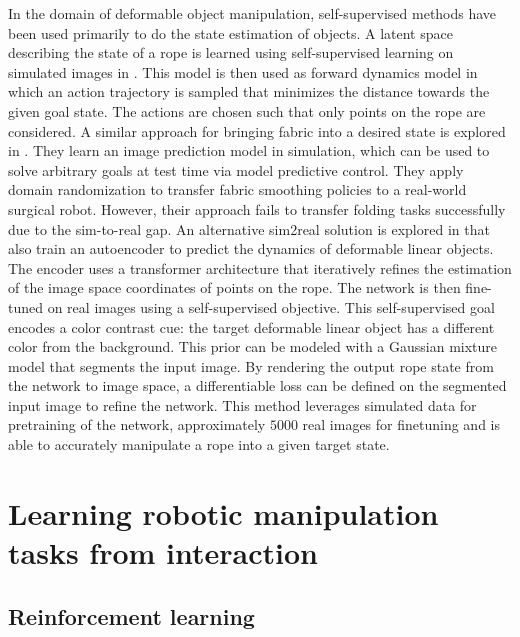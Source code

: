 \documentclass[\home/main.tex]{subfiles}
\begin{document}
In the domain of deformable object manipulation, self-supervised methods have been used primarily to do the state estimation of objects. A latent space describing the state of a rope is learned using self-supervised learning on simulated images in \autocite{yan2020learning}. This model is then used as forward dynamics model in which an action trajectory is sampled that minimizes the distance towards the given goal state. The actions are chosen such that only points on the rope are considered. A similar approach for bringing fabric into a desired state is explored in \autocite{fabric_vsf_2020}. They learn an image prediction model in simulation, which can be used to solve arbitrary goals at test time via model predictive control. They apply domain randomization to transfer fabric smoothing policies to a real-world surgical robot. However, their approach fails to transfer folding tasks successfully due to the sim-to-real gap. An alternative sim2real solution is explored in \autocite{Mengyuan2020} that also train an autoencoder to predict the dynamics of deformable linear objects. The encoder uses a transformer architecture \autocite{vaswani2017attention} that iteratively refines the estimation of the image space coordinates of points on the rope. The network is then fine-tuned on real images using a self-supervised objective. This self-supervised goal encodes a color contrast cue: the target deformable linear object has a different color from the background. This prior can be modeled with a Gaussian mixture model that segments the input image. By rendering the output rope state from the network to image space, a differentiable loss can be defined on the segmented input image to refine the network. This method leverages simulated data for pretraining of the network, approximately $5000$ real images for finetuning and is able to accurately manipulate a rope into a given target state.

\section{Learning robotic manipulation tasks from interaction} \label{subsec:lit_rl}
\subsection{Reinforcement learning}
\end{document}
